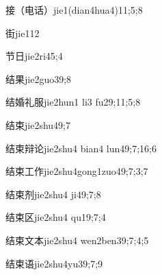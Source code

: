 \begin{verbete}{接（电话）}{jie1(dian4hua4)}{11;5;8}
\end{verbete}

\begin{verbete}{街}{jie1}{12}
\end{verbete}

\begin{verbete}{节日}{jie2ri4}{5;4}
\end{verbete}

\begin{verbete}{结果}{jie2guo3}{9;8}
\end{verbete}

\begin{verbete}{结婚礼服}{jie2hun1 li3 fu2}{9;11;5;8}
\end{verbete}

\begin{verbete}{结束}{jie2shu4}{9;7}
\end{verbete}

\begin{verbete}{结束辩论}{jie2shu4 bian4 lun4}{9;7;16;6}
\end{verbete}

\begin{verbete}{结束工作}{jie2shu4gong1zuo4}{9;7;3;7}
\end{verbete}

\begin{verbete}{结束剂}{jie2shu4 ji4}{9;7;8}
\end{verbete}

\begin{verbete}{结束区}{jie2shu4 qu1}{9;7;4}
\end{verbete}

\begin{verbete}{结束文本}{jie2shu4 wen2ben3}{9;7;4;5}
\end{verbete}

\begin{verbete}{结束语}{jie2shu4yu3}{9;7;9}
\end{verbete}

